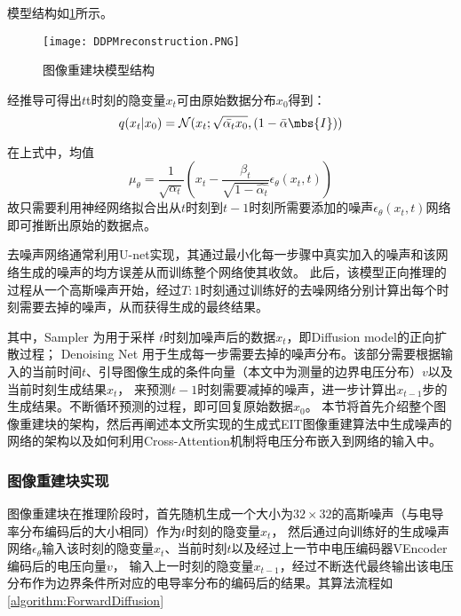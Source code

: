 模型结构如\cref{figure:DDPMreconstruction}所示。








\begin{figure}[h]
    \centering
    \texttt{[image: DDPMreconstruction.PNG]}
    \caption{图像重建块模型结构}
    \label{figure:DDPMreconstruction}
\end{figure}








经推导\cite{DDPM}可得出$t$t时刻的隐变量$x_t$可由原始数据分布$x_0$得到：
\begin{equation}
  \centering
  q(x_t|x_0) = \mathcal{N}(x_t; \sqrt{\bar{\alpha_t}x_0}, (1-\bar{\alpha}\mbs{I}))
\end{equation}



在上式中，均值
\begin{equation}
  \mu_\theta = \frac{1}{\sqrt{\alpha_t}}(x_t - \frac{\beta_t}{\sqrt{1-\hat{\alpha_t}}}\epsilon_\theta(x_t, t))  
\end{equation}
故只需要利用神经网络拟合出从$t$时刻到$t-1$时刻所需要添加的噪声$\epsilon_\theta(x_t, t)$网络即可推断出原始的数据点。

去噪声网络通常利用U-net实现，其通过最小化每一步骤中真实加入的噪声和该网络生成的噪声的均方误差从而训练整个网络使其收敛。
此后，该模型正向推理的过程从一个高斯噪声开始，经过$T:1$时刻通过训练好的去噪网络分别计算出每个时刻需要去掉的噪声，从而获得生成的最终结果。


其中，Sampler 为用于采样 $t$时刻加噪声后的数据$x_t$，即Diffusion model的正向扩散过程；
Denoising Net 用于生成每一步需要去掉的噪声分布。该部分需要根据输入的当前时间$t$、引导图像生成的条件向量（本文中为测量的边界电压分布）$v$以及当前时刻生成结果$x_t$，
来预测$t-1$时刻需要减掉的噪声，进一步计算出$x_{t-1}$步的生成结果。不断循环预测的过程，即可回复原始数据$x_0$。
本节将首先介绍整个图像重建块的架构，然后再阐述本文所实现的生成式EIT图像重建算法中生成噪声的网络的架构以及如何利用Cross-Attention机制将电压分布嵌入到网络的输入中。

\subsubsection{图像重建块实现}

图像重建块在推理阶段时，首先随机生成一个大小为$32\times 32$的高斯噪声（与电导率分布编码后的大小相同）作为$t$时刻的隐变量$x_t$，
然后通过向训练好的生成噪声网络$\epsilon_\theta$输入该时刻的隐变量$x_t$、当前时刻$t$以及经过上一节中电压编码器VEncoder编码后的电压向量$v$，
输入上一时刻的隐变量$x_{t-1}$，经过不断迭代最终输出该电压分布作为边界条件所对应的电导率分布的编码后的结果。其算法流程如\cref{algorithm:ForwardDiffusion}

